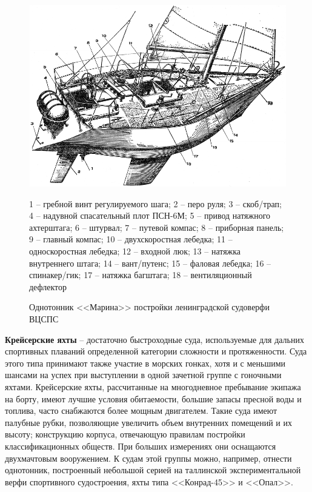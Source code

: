 \documentclass[a4paper, 12pt, twoside, final, book, russian, fittopage, cyremdash]{ncc}
\begin{document}
\begin{figure}[htb]
  \centering
  \includegraphics[scale=1.3]{0032P}
  \caption{Однотонник <<Марина>> постройки ленинградской судоверфи ВЦСПС}
  \label{fig:32}
  \small
  \centering{}
  1 \--- гребной винт регулируемого шага; 2 \--- перо руля; 3 \--- скоб\-/трап; 4 \--- надувной спасательный плот ПСН-6М; 5 \--- привод натяжного ахтерштага; 6 \--- штурвал; 7 \--- путевой компас; 8 \--- приборная панель; 9 \--- главный компас; 10 \--- двухскоростная лебедка; 11 \--- односкоростная лебедка; 12 \--- входной люк; 13 \--- натяжка внутреннего штага; 14 \--- вант\-/путенс; 15 \--- фаловая лебедка; 16 \--- спинакер\-/гик; 17 \--- натяжка багштага; 18 \--- вентиляционный дефлектор
\end{figure}

\textbf{Крейсерские яхты} \--- достаточно быстроходные суда, используемые для дальних спортивных плаваний определенной категории сложности и протяженности. Суда этого типа принимают также участие в морских гонках, хотя и с меньшими шансами на успех при выступлении в одной зачетной группе с гоночными яхтами. Крейсерские яхты, рассчитанные на многодневное пребывание экипажа на борту, имеют лучшие условия обитаемости, большие запасы пресной воды и топлива, часто снабжаются более мощным двигателем. Такие суда имеют палубные рубки, позволяющие увеличить объем внутренних помещений и их высоту; конструкцию корпуса, отвечающую правилам постройки классификационных обществ. При больших измерениях они оснащаются двухмачтовым вооружением. К судам этой группы можно, например, отнести однотонник, построенный небольшой серией на таллинской экспериментальной верфи спортивного судостроения, яхты типа <<Конрад-45>> и <<Опал>>.
\end{document}
